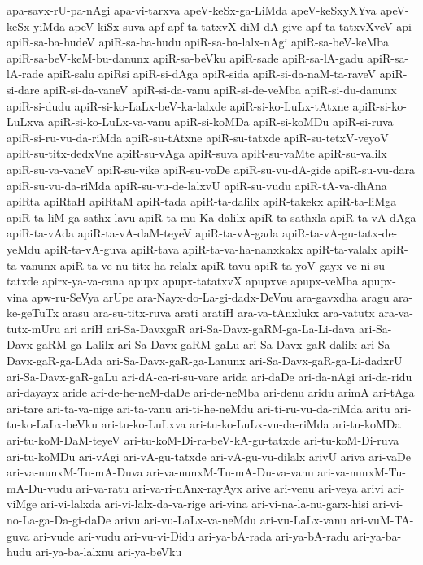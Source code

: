 {apa-savx-rU-pa-nAgi
apa-vi-tarxva
apeV-keSx-ga-LiMda
apeV-keSxyXYva
apeV-keSx-yiMda
apeV-kiSx-suva
apf
apf-ta-tatxvX-diM-dA-give
apf-ta-tatxvXveV
api
apiR-sa-ba-hudeV
apiR-sa-ba-hudu
apiR-sa-ba-lalx-nAgi
apiR-sa-beV-keMba
apiR-sa-beV-keM-bu-danunx
apiR-sa-beVku
apiR-sade
apiR-sa-lA-gadu
apiR-sa-lA-rade
apiR-salu
apiRsi
apiR-si-dAga
apiR-sida
apiR-si-da-naM-ta-raveV
apiR-si-dare
apiR-si-da-vaneV
apiR-si-da-vanu
apiR-si-de-veMba
apiR-si-du-danunx
apiR-si-dudu
apiR-si-ko-LaLx-beV-ka-lalxde
apiR-si-ko-LuLx-tAtxne
apiR-si-ko-LuLxva
apiR-si-ko-LuLx-va-vanu
apiR-si-koMDa
apiR-si-koMDu
apiR-si-ruva
apiR-si-ru-vu-da-riMda
apiR-su-tAtxne
apiR-su-tatxde
apiR-su-tetxV-veyoV
apiR-su-titx-dedxVne
apiR-su-vAga
apiR-suva
apiR-su-vaMte
apiR-su-valilx
apiR-su-va-vaneV
apiR-su-vike
apiR-su-voDe
apiR-su-vu-dA-gide
apiR-su-vu-dara
apiR-su-vu-da-riMda
apiR-su-vu-de-lalxvU
apiR-su-vudu
apiR-tA-va-dhAna
apiRta
apiRtaH
apiRtaM
apiR-tada
apiR-ta-dalilx
apiR-takekx
apiR-ta-liMga
apiR-ta-liM-ga-sathx-lavu
apiR-ta-mu-Ka-dalilx
apiR-ta-sathxla
apiR-ta-vA-dAga
apiR-ta-vAda
apiR-ta-vA-daM-teyeV
apiR-ta-vA-gada
apiR-ta-vA-gu-tatx-de-yeMdu
apiR-ta-vA-guva
apiR-tava
apiR-ta-va-ha-nanxkakx
apiR-ta-valalx
apiR-ta-vanunx
apiR-ta-ve-nu-titx-ha-relalx
apiR-tavu
apiR-ta-yoV-gayx-ve-ni-su-tatxde
apirx-ya-va-cana
apupx
apupx-tatatxvX
apupxve
apupx-veMba
apupx-vina
apw-ru-SeVya
arUpe
ara-Nayx-do-La-gi-dadx-DeVnu
ara-gavxdha
aragu
ara-ke-geTuTx
arasu
ara-su-titx-ruva
arati
aratiH
ara-va-tAnxlukx
ara-vatutx
ara-va-tutx-mUru
ari
ariH
ari-Sa-DavxgaR
ari-Sa-Davx-gaRM-ga-La-Li-dava
ari-Sa-Davx-gaRM-ga-Lalilx
ari-Sa-Davx-gaRM-gaLu
ari-Sa-Davx-gaR-dalilx
ari-Sa-Davx-gaR-ga-LAda
ari-Sa-Davx-gaR-ga-Lanunx
ari-Sa-Davx-gaR-ga-Li-dadxrU
ari-Sa-Davx-gaR-gaLu
ari-dA-ca-ri-su-vare
arida
ari-daDe
ari-da-nAgi
ari-da-ridu
ari-dayayx
aride
ari-de-he-neM-daDe
ari-de-neMba
ari-denu
aridu
arimA
ari-tAga
ari-tare
ari-ta-va-nige
ari-ta-vanu
ari-ti-he-neMdu
ari-ti-ru-vu-da-riMda
aritu
ari-tu-ko-LaLx-beVku
ari-tu-ko-LuLxva
ari-tu-ko-LuLx-vu-da-riMda
ari-tu-koMDa
ari-tu-koM-DaM-teyeV
ari-tu-koM-Di-ra-beV-kA-gu-tatxde
ari-tu-koM-Di-ruva
ari-tu-koMDu
ari-vAgi
ari-vA-gu-tatxde
ari-vA-gu-vu-dilalx
arivU
ariva
ari-vaDe
ari-va-nunxM-Tu-mA-Duva
ari-va-nunxM-Tu-mA-Du-va-vanu
ari-va-nunxM-Tu-mA-Du-vudu
ari-va-ratu
ari-va-ri-nAnx-rayAyx
arive
ari-venu
ari-veya
arivi
ari-viMge
ari-vi-lalxda
ari-vi-lalx-da-va-rige
ari-vina
ari-vi-na-la-nu-garx-hisi
ari-vi-no-La-ga-Da-gi-daDe
arivu
ari-vu-LaLx-va-neMdu
ari-vu-LaLx-vanu
ari-vuM-TA-guva
ari-vude
ari-vudu
ari-vu-vi-Didu
ari-ya-bA-rada
ari-ya-bA-radu
ari-ya-ba-hudu
ari-ya-ba-lalxnu
ari-ya-beVku
}
